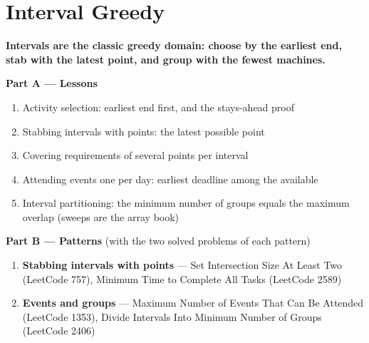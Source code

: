 \chapter{Interval Greedy}
\label{ch:intervals}

\begin{tcolorbox}[enhanced, colback=white, colframe=secondaryblue, boxrule=1pt, arc=2mm]
\textbf{\large\textcolor{primaryblue}{Intervals are the classic greedy domain: choose by the earliest end, stab with the latest point, and group with the fewest machines.}}
\end{tcolorbox}


\begin{plannedbox}
\textbf{Part A --- Lessons}
\begin{enumerate}[leftmargin=*, label=\textbf{A\arabic*.}, itemsep=1pt]
    \item Activity selection: earliest end first, and the stays-ahead proof
    \item Stabbing intervals with points: the latest possible point
    \item Covering requirements of several points per interval
    \item Attending events one per day: earliest deadline among the available
    \item Interval partitioning: the minimum number of groups equals the maximum overlap (sweeps are the array book)
\end{enumerate}
\textbf{Part B --- Patterns} (with the two solved problems of each pattern)
\begin{enumerate}[leftmargin=*, label=\textbf{P\arabic*.}, itemsep=1pt]
    \item \textbf{Stabbing intervals with points} --- Set Intersection Size At Least Two {\small\color{darkgray}(LeetCode 757)}, Minimum Time to Complete All Tasks {\small\color{darkgray}(LeetCode 2589)}
    \item \textbf{Events and groups} --- Maximum Number of Events That Can Be Attended {\small\color{darkgray}(LeetCode 1353)}, Divide Intervals Into Minimum Number of Groups {\small\color{darkgray}(LeetCode 2406)}
\end{enumerate}
\end{plannedbox}
